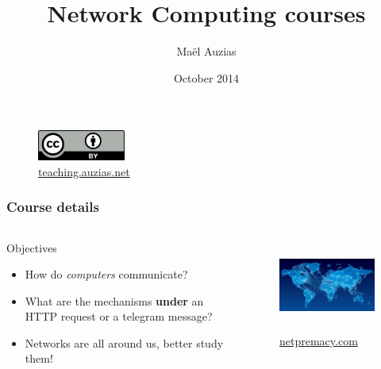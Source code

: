 \documentclass{beamer}
\title{Network Computing courses}
\author{Maël Auzias}
\institute{ENSIBS - UBS}
\date{October 2014}
\begin{document}
\begin{frame}
  \titlepage
  \begin{figure}[p]
      \centering
      \includegraphics[height=1cm]{./imgs/cc40.jpg}
      \caption{\color{blue}\href{http://teaching.auzias.net}{teaching.auzias.net}}
    \label{fig:cc40}
  \end{figure}
\end{frame}


  \begin{frame}
    \frametitle{Course details}
    \begin{columns}
        \begin{block}{Objectives}
          \begin{itemize}
            \item How do \emph{computers} communicate?
            \item What are the mechanisms \textbf{under} an HTTP request or a telegram message?
            \item Networks are all around us, better study them!
          \end{itemize}
        \end{block}
        \begin{figure}[t]
          \centering
          \includegraphics[height=3cm]{./imgs/ntwks.jpeg}
          \caption{\color{blue}\href{http://www.netpremacy.com}{netpremacy.com}}
          \label{fig:ntwks}
        \end{figure}
    \end{columns}
  \end{frame}
\end{document}
